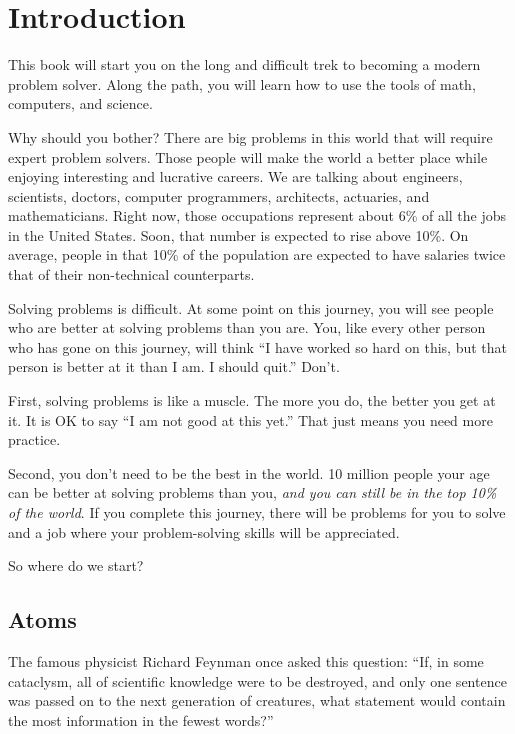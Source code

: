 \chapter{Introduction}

This book will start you on the long and difficult trek to becoming a modern
problem solver. Along the path, you will learn how to use the tools of
math, computers, and science. 

Why should you bother? There are big problems in this world that will
require expert problem solvers. Those people will make the world a
better place while enjoying interesting and lucrative careers. We are
talking about engineers, scientists, doctors, computer programmers,
architects, actuaries, and mathematicians. Right now, those occupations represent
about 6\% of all the jobs in the United States. Soon,
that number is expected to rise above 10\%.  On average, people in
that 10\% of the population are expected to have salaries twice that
of their non-technical counterparts.

Solving problems is difficult. At some point on this journey, you will
see people who are better at solving problems than you are. You, like
every other person who has gone on this journey, will think ``I have
worked so hard on this, but that person is better at it than
I am. I should quit.'' Don't.

First, solving problems is like a muscle. The more you do, the better
you get at it.  It is OK to say ``I am not good at this yet.'' That
just means you need more practice.

Second, you don't need to be the best in the world. 10 million people
your age can be better at solving problems than you, \textit{and you
  can still be in the top 10\% of the world}. If you complete this
journey, there will be problems for you to solve and a job where your
problem-solving skills will be appreciated.

So where do we start?

\section{Atoms}

The famous physicist Richard Feynman once asked this question: ``If,
in some cataclysm, all of scientific knowledge were to be destroyed,
and only one sentence was passed on to the next generation of
creatures, what statement would contain the most information in the
fewest words?''

